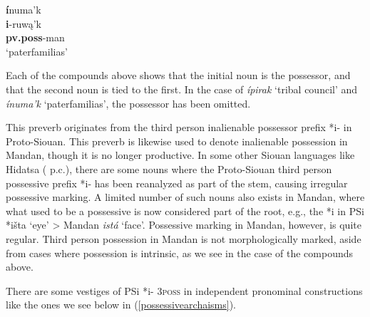 \begin{exe}
\begin{xlist}
	\item \glll \textbf{í}numa'k\\
	\textbf{i}-ruwą'k\\
	\textbf{pv.poss}-\textnormal{man}\\
	\glt `paterfamilias' \citep[438]{hollow1970}
	
	\end{xlist}

\end{exe}

Each of the compounds above shows that the initial noun is the possessor, and that the second noun is tied to the first. In the case of \textit{ípirak} `tribal council' and \textit{ínuma'k} `paterfamilias', the possessor has been omitted.

This preverb originates from the third person inalienable possessor prefix *i- in Proto-Siouan. This preverb is likewise used to denote inalienable possession in Mandan, though it is no longer productive. In some other Siouan languages like Hidatsa (\citeauthor{boyle2007} p.c.), there are some nouns where the Proto-Siouan third person possessive prefix *i- has been reanalyzed as part of the stem, causing irregular possessive marking. A limited number of such nouns also exists in Mandan, where what used to be a possessive is now considered part of the root, e.g., the *i in PSi *išta `eye' > Mandan \textit{istá} `face'.  Possessive marking in Mandan, however, is quite regular. Third person possession in Mandan is not morphologically marked, aside from cases where possession is intrinsic, as we see in the case of the compounds above.

There are some vestiges of PSi *i- \textsc{3poss} in independent pronominal constructions like the ones we see below in (\ref{possessivearchaisms}).

